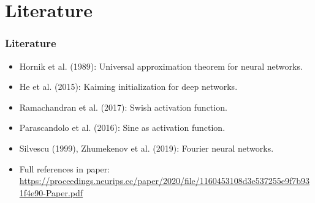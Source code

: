 \documentclass[aspectratio=169, 12pt]{beamer}
\begin{document}
\section{Literature}
\begin{frame}
\frametitle{Literature}
\begin{itemize}
    \item Hornik et al. (1989): Universal approximation theorem for neural networks.
    \item He et al. (2015): Kaiming initialization for deep networks.
    \item Ramachandran et al. (2017): Swish activation function.
    \item Parascandolo et al. (2016): Sine as activation function.
    \item Silvescu (1999), Zhumekenov et al. (2019): Fourier neural networks.
    \item Full references in paper: \url{https://proceedings.neurips.cc/paper/2020/file/1160453108d3e537255e9f7b931f4e90-Paper.pdf}
\end{itemize}
\end{frame}
\end{document}
